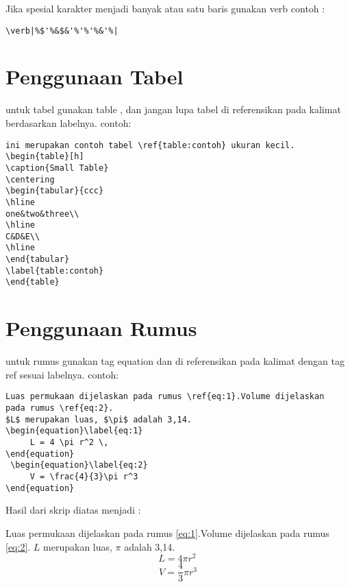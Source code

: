 Jika spesial karakter menjadi banyak atau satu baris gunakan verb
contoh :
\begin{verbatim}
\verb|%$'%&$&'%'%'%&'%|
\end{verbatim}

\section{Penggunaan Tabel}

untuk tabel gunakan table , dan jangan lupa tabel di referensikan pada kalimat berdasarkan labelnya. 
contoh:
\begin{verbatim}
ini merupakan contoh tabel \ref{table:contoh} ukuran kecil.
\begin{table}[h]
\caption{Small Table}
\centering
\begin{tabular}{ccc}
\hline
one&two&three\\
\hline
C&D&E\\
\hline
\end{tabular}
\label{table:contoh}
\end{table}
    \end{verbatim}

\section{Penggunaan Rumus}

untuk rumus gunakan tag equation dan di referensikan pada kalimat dengan tag ref sesuai labelnya. contoh:
\begin{verbatim}
Luas permukaan dijelaskan pada rumus \ref{eq:1}.Volume dijelaskan 
pada rumus \ref{eq:2}.
$L$ merupakan luas, $\pi$ adalah 3,14.
\begin{equation}\label{eq:1}
     L = 4 \pi r^2 \,
\end{equation}
 \begin{equation}\label{eq:2}
     V = \frac{4}{3}\pi r^3
\end{equation}
\end{verbatim}
Hasil dari skrip diatas menjadi :

Luas permukaan dijelaskan pada rumus \ref{eq:1}.Volume dijelaskan 
pada rumus \ref{eq:2}.
$L$ merupakan luas, $\pi$ adalah 3,14.
\begin{equation}\label{eq:1}
     L = 4 \pi r^2 \,
\end{equation}
 \begin{equation}\label{eq:2}
     V = \frac{4}{3}\pi r^3
\end{equation}
 
